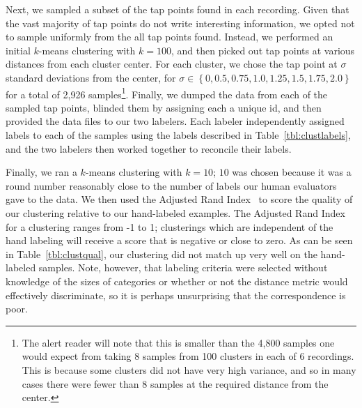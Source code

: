 Next, we sampled a subset of the tap points found in each recording.
Given that the vast majority of tap points do not write interesting
information, we opted not to sample uniformly from the all tap points
found. Instead, we performed an initial $k$-means clustering with $k =
100$, and then picked out tap points at various distances from each
cluster center. For each cluster, we chose the tap point at $\sigma$
standard deviations from the center, for $\sigma \in \left\{0, 0.5,
0.75, 1.0, 1.25, 1.5, 1.75, 2.0 \right\}$ for a total of 2,926
samples\footnote{The alert reader will note that this is smaller than
the 4,800 samples one would expect from taking 8 samples from 100
clusters in each of 6 recordings. This is because some clusters did not
have very high variance, and so in many cases there were fewer than 8
samples at the required distance from the center.}. Finally, we dumped
the data from each of the sampled tap points, blinded them by assigning
each a unique id, and then provided the data files to our two labelers.
Each labeler independently assigned labels to each of the samples using
the labels described in Table~\ref{tbl:clustlabels}, and the two
labelers then worked together to reconcile their labels.  

Finally, we ran a $k$-means clustering with $k = 10$; $10$ was chosen
because it was a round number reasonably close to the number of labels our
human evaluators gave to the data. We then used the Adjusted Rand
Index~\cite{Hubert:1985zr} to score the quality of our clustering
relative to our hand-labeled examples. The Adjusted Rand Index for a
clustering ranges from -1 to 1; clusterings which are independent of the
hand labeling will receive a score that is negative or close to zero. As
can be seen in Table~\ref{tbl:clustqual}, our clustering did not match 
up very well on the hand-labeled samples.  Note, however, that labeling
criteria were selected without knowledge of the sizes of categories or
whether or not the distance metric would effectively discriminate, so it
is perhaps unsurprising that the correspondence is poor.

